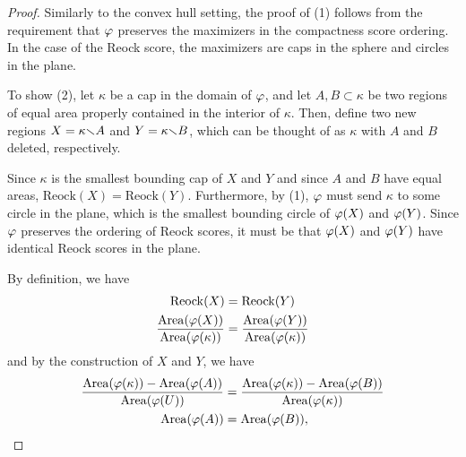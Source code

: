 \begin{proof}
  Similarly to the convex hull setting, the proof of (1) follows from
  the requirement that $\varphi$ preserves the maximizers in the
  compactness score ordering.  In the case of the Reock score, the
  maximizers are caps in the sphere and circles in the plane.  

  To show (2), let $\kappa$ be a cap in the domain of $\varphi$, and let 
  $A,B\subset \kappa$ be two regions of equal area properly 
  contained in the interior of $\kappa$. Then, define two new regions
  $X=\kappa{\smallsetminus} A$ and $Y=\kappa{\smallsetminus} B$, which can be thought of as
  $\kappa$ with $A$ and $B$ deleted, respectively. 

  Since $\kappa$ is the smallest bounding cap of $X$ and $Y$ and since
  $A$ and $B$ have equal areas, $\mathrm{Reock}(X)=\mathrm{Reock}(Y)$.
  Furthermore, by (1), $\varphi$ must send $\kappa$ to some circle in
  the plane, which is the smallest bounding circle of $\varphi(X)$ and
  $\varphi(Y)$.    
  Since $\varphi$ preserves the ordering of Reock scores, it must be
  that $\varphi(X)$ and $\varphi(Y)$ have identical Reock scores in the
  plane.

  By definition, we have
  \begin{align*}
    \mathrm{Reock}(X) &= \mathrm{Reock}(Y)\\
    \frac{\mathrm{Area}(\varphi(X))}{\mathrm{Area}(\varphi(\kappa))} &= \frac{\mathrm{Area}(\varphi(Y))}{\mathrm{Area}(\varphi(\kappa))}
  \end{align*}
  and by the construction of $X$ and $Y$, we have 
  \begin{align*}
    \frac{\mathrm{Area}(\varphi(\kappa))
    - \mathrm{Area}(\varphi(A))}{\mathrm{Area}(\varphi(U))} &=
    \frac{\mathrm{Area}(\varphi(\kappa))
    - \mathrm{Area}(\varphi(B))}{\mathrm{Area}(\varphi(\kappa))}\\
    \mathrm{Area}(\varphi(A)) &= \mathrm{Area}(\varphi(B)),
  \end{align*}


\end{proof}
